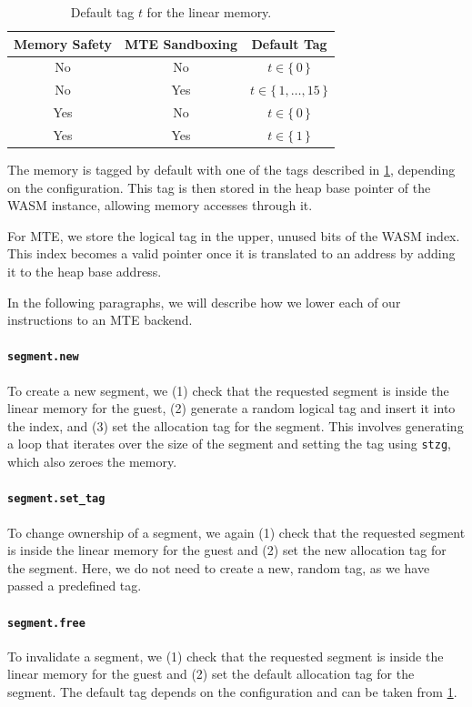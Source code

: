 \begin{table}
  \centering
  \begin{tabular}{c | c || c}
    \textbf{Memory Safety} & \textbf{MTE Sandboxing} & \textbf{Default Tag} \\
    \hline
    No  & No  & $t \in \{\,0\,\}$ \\
    No  & Yes & $t \in \{\,1, \dots, 15\,\}$ \\
    Yes & No  & $t \in \{\,0\,\}$ \\
    Yes & Yes & $t \in \{\,1\,\}$
  \end{tabular}
  \caption{Default tag $t$ for the linear memory.}
  \label{tab:default-tag}
\end{table}

The memory is tagged by default with one of the tags described in \cref{tab:default-tag}, depending on the configuration.
This tag is then stored in the heap base pointer of the \ac{WASM} instance, allowing memory accesses through it.

For \ac{MTE}, we store the logical tag in the upper, unused bits of the \ac{WASM} index.
This index becomes a valid pointer once it is translated to an address by adding it to the heap base address.

In the following paragraphs, we will describe how we lower each of our instructions to an \ac{MTE} backend.

\paragraph{\texttt{segment.new}} To create a new segment, we (1) check that the requested segment is inside the linear memory for the guest, (2) generate a random logical tag and insert it into the index, and (3) set the allocation tag for the segment.
This involves generating a loop that iterates over the size of the segment and setting the tag using \texttt{stzg}, which also zeroes the memory.

\paragraph{\texttt{segment.set\_tag}} To change ownership of a segment, we again (1) check that the requested segment is inside the linear memory for the guest and (2) set the new allocation tag for the segment.
Here, we do not need to create a new, random tag, as we have passed a predefined tag.

\paragraph{\texttt{segment.free}} To invalidate a segment, we (1) check that the requested segment is inside the linear memory for the guest and (2) set the default allocation tag for the segment.
The default tag depends on the configuration and can be taken from \cref{tab:default-tag}.

